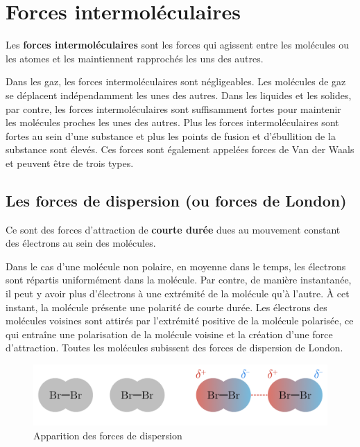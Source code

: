 \documentclass[
  11pt,
  a4paper,
  openany]{book}
\begin{document}
\hypertarget{forces-intermoluxe9culaires}{%
\section{Forces intermoléculaires}\label{forces-intermoluxe9culaires}}

Les \textbf{forces intermoléculaires} sont les forces qui agissent entre les molécules ou les atomes et les maintiennent rapprochés les uns des autres.

Dans les gaz, les forces intermoléculaires sont négligeables. Les molécules de gaz se déplacent indépendamment les unes des autres. Dans les liquides et les solides, par contre, les forces intermoléculaires sont suffisamment fortes pour maintenir les molécules proches les unes des autres. Plus les forces intermoléculaires sont fortes au sein d'une substance et plus les points de fusion et d'ébullition de la substance sont élevés. Ces forces sont également appelées forces de Van der Waals et peuvent être de trois types.

\hypertarget{les-forces-de-dispersion-ou-forces-de-london}{%
\subsection{Les forces de dispersion (ou forces de London)}\label{les-forces-de-dispersion-ou-forces-de-london}}

Ce sont des forces d'attraction de \textbf{courte durée} dues au mouvement constant des électrons au sein des molécules.

Dans le cas d'une molécule non polaire, en moyenne dans le temps, les électrons sont répartis uniformément dans la molécule. Par contre, de manière instantanée, il peut y avoir plus d'électrons à une extrémité de la molécule qu'à l'autre. À cet instant, la molécule présente une polarité de courte durée. Les électrons des molécules voisines sont attirés par l'extrémité positive de la molécule polarisée, ce qui entraîne une polarisation de la molécule voisine et la création d'une force d'attraction. Toutes les molécules subissent des forces de dispersion de London.

\begin{figure}

{\centering \includegraphics[width=0.67\linewidth]{images/forces-london} 

}

\caption{Apparition des forces de dispersion}\label{fig:forces-london}
\end{figure}
\end{document}
